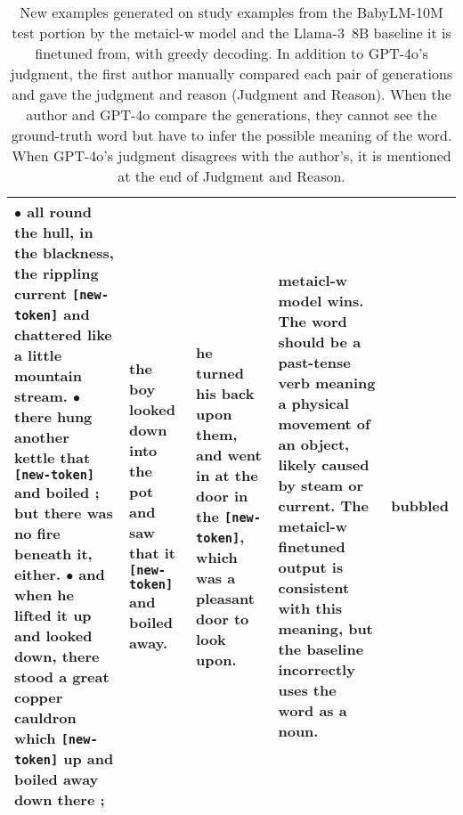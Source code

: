 \documentclass{article}
\begin{document}
\begin{table*}[t]
\begin{center}
\begin{tabular}{p{5.3cm}p{2.3cm}p{2.3cm}p{3cm}p{0.8cm}}
$\bullet$ all round the hull, in the blackness, the rippling current \texttt{[new-token]} and chattered like a little mountain stream.
$\bullet$ there hung another kettle that \texttt{[new-token]} and boiled ; but there was no fire beneath it, either.
$\bullet$ and when he lifted it up and looked down, there stood a great copper cauldron which \texttt{[new-token]} up and boiled away down there ;
& the boy looked down into the pot and saw that it \texttt{[new-token]} and boiled away.
& he turned his back upon them, and went in at the door in the \texttt{[new-token]}, which was a pleasant door to look upon.
& \ac{metaicl-w} model wins. The word should be a past-tense verb meaning a physical movement of an object, likely caused by steam or current. The \ac{metaicl-w} finetuned output is consistent with this meaning, but the baseline incorrectly uses the word as a noun.
& bubbled
\\
\bottomrule
\end{tabular}
\end{center}
\caption{New examples generated on study examples from the BabyLM-10M test portion by the \ac{metaicl-w} model and the \mbox{Llama-3 8B} baseline it is finetuned from, with greedy decoding.
In addition to \mbox{GPT-4o}'s judgment, the first author manually compared each pair of generations and gave the judgment and reason (Judgment and Reason).
When the author and \mbox{GPT-4o} compare the generations, they cannot see the ground-truth word but have to infer the possible meaning of the word.
When \mbox{GPT-4o}'s judgment disagrees with the author's, it is mentioned at the end of Judgment and Reason.
}
\label{tab:babylm-generation}
\end{table*}
\end{document}
